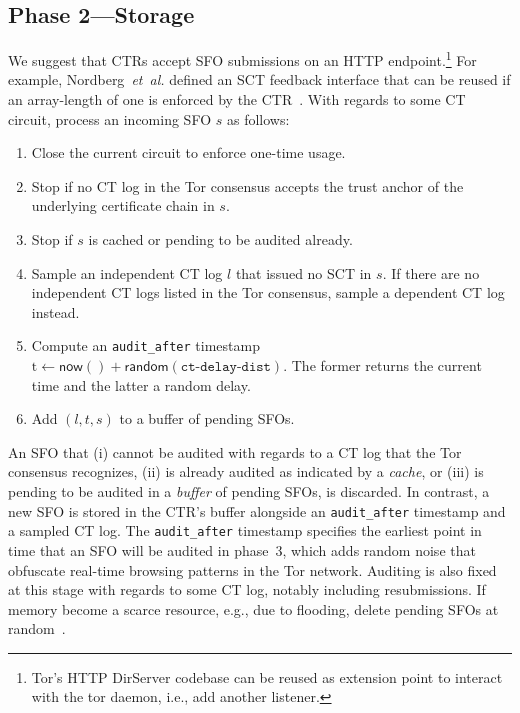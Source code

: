 \subsection{Phase 2---Storage} \label{sec:base:phase2}
We suggest that CTRs accept SFO submissions on an HTTP endpoint.\footnote{%
	Tor's HTTP DirServer codebase can be reused as extension point to interact
	with the tor daemon, i.e., add another listener.
} For example, Nordberg~\emph{et~al.} defined an SCT feedback interface that can
be reused if an array-length of one is enforced by the CTR~\cite{nordberg}.
With regards to some CT circuit, process an incoming SFO $s$ as follows:
\begin{enumerate}
	\item\label{enm:storage:close} Close the current circuit to enforce one-time
		usage.
	\item\label{enm:storage:unrecognized} Stop if no CT log in the Tor consensus
		accepts the trust anchor of the underlying certificate chain in $s$.
	\item\label{enm:storage:cached}
		Stop if $s$ is cached or pending to be audited already.
	\item\label{enm:storage:fix-log} Sample an independent CT log $l$ that
		issued no SCT in $s$.  If there are no independent CT logs listed in the
		Tor consensus, sample a dependent CT log instead.
	\item\label{enm:storage:audit-after} Compute an \texttt{audit\_after}
		timestamp $\textrm{t} \gets \mathsf{now()} +
			\mathsf{random}(\texttt{ct-delay-dist})$.
		The former returns the current time and the latter a random delay.
	\item\label{enm:storage:store} Add $(l,t,s)$ to a buffer of pending SFOs.
\end{enumerate}

An SFO that
	(i) cannot be audited with regards to a CT log that the Tor consensus
		recognizes,
	(ii) is already audited as indicated by a \emph{cache}, or
	(iii) is pending to be audited in a \emph{buffer} of pending SFOs,
is discarded.  In contrast, a new SFO is stored in the CTR's buffer
alongside an \texttt{audit\_after} timestamp and a sampled CT log.  The
\texttt{audit\_after} timestamp specifies the earliest point in time that an SFO
will be audited in phase~3, which adds random noise that obfuscate real-time
browsing patterns in the Tor network.  Auditing is also fixed at this stage with
regards to some CT log, notably including resubmissions.  If memory become a
scarce resource, e.g., due to flooding, delete pending SFOs at
random~\cite{nordberg}.

